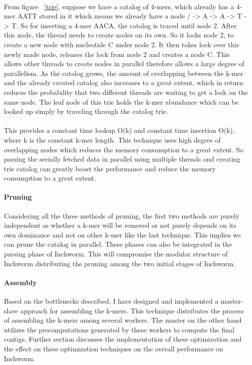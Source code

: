 \label{key}\documentclass[plainarticle, english ,zihtitle,final,hyperref,utf8]{zihpub}
\begin{document}
\paragraph{}
From figure ~\ref{trie}, suppose we have a catalog of 4-mers, which already has a 4-mer AATT stored in it which means we already have a node / -> A -> A -> T -> T. So for inserting a 4-mer AACA, the catalog is traced until node 2. After this node, the thread needs to create nodes on its own. So it locks node 2, to create a new node with nucleotide C under node 2. It then takes lock over this newly made node, releases the lock from node 2 and creates a node C. This allows other threads to create nodes in parallel therefore allows a large degree of parallelism. As the catalog grows, the amount of overlapping between the k-mer and the already created catalog also increases to a great extent, which in return reduces the probability that two different threads are waiting to get a lock on the same node. The leaf node of this trie holds the k-mer abundance which can be looked up simply by traveling through the catalog trie.
\paragraph{}
This provides a constant time lookup O(k) and constant time insertion O(k), where k is the constant k-mer length. This technique uses high degree of overlapping nodes which reduces the memory consumption to a great extent. So parsing the serially fetched data in parallel using multiple threads and creating trie catalog can greatly boost the performance and reduce the memory consumption to a great extent.
\paragraph{Pruning}
Considering all the three methods of pruning, the first two methods are purely independent as whether a k-mer will be removed or not purely depends on its own dominance and not on other k-mer like the last technique. This implies we can prune the catalog in parallel. These phases can also be integrated in the parsing phase of Inchworm. This will compromise the modular structure of Inchworm distributing the pruning among the two initial stages of Inchworm.
\paragraph{Assembly}
Based on the bottlenecks described, I have designed and implemented a master-slave approach for assembling the k-mers. This technique distributes the process of assembling the k-mers among several workers. The master on the other hand utilizes the precomputations generated by these workers to compute the final contigs. Further section discusses the implementation of these optimization and the effect on these optimization techniques on the overall performance on Inchworm.
\end{document}
